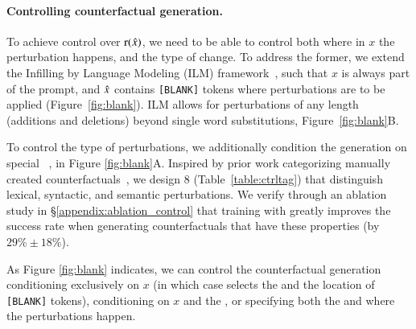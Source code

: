\paragraph{Controlling counterfactual generation.}
To achieve control over $\operatorname*{r}(\hat{x})$, we need to be able to control both where in $x$ the perturbation happens, and the type of change. To address the former, 
we extend the Infilling by Language Modeling (ILM) framework~\cite{donahue2020enabling}, such that $x$ is always part of the prompt, and $\hat{x}$ contains \texttt{[BLANK]} tokens where perturbations are to be applied (Figure~\ref{fig:blank}). 
ILM allows for perturbations of any length (additions and deletions) beyond single word substitutions, \eg Figure~\ref{fig:blank}B.

To control the type of perturbations, we additionally condition the generation on special \tagstrs~\cite{raffel2019exploring, Dathathri2020Plug}, \eg {} in Figure \ref{fig:blank}A.
Inspired by prior work categorizing manually created counterfactuals~\cite{kaushik2019learning, gardner2020contrast}, we design 8 \tagstrshorts (Table~\ref{table:ctrltag}) that distinguish lexical, syntactic, and semantic perturbations. 
We verify through an ablation study in \S\ref{appendix:ablation_control} that training \sysname with \tagstrs greatly improves the success rate when generating counterfactuals that have these properties (by $29\% \pm 18\%$). 

As Figure \ref{fig:blank} indicates, we can control the counterfactual generation conditioning exclusively on $x$ (in which case \sysname selects the \tagstr and the location of \texttt{[BLANK]} tokens), conditioning on $x$ and the \tagstr, or specifying both the \tagstrshort and where the perturbations happen.




